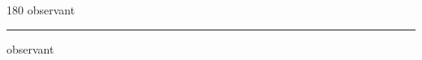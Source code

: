 
\begin{frame}
\begin{center}
\begin{turn}{180}
{\fontsize{2.5cm}{1em}\selectfont observant}
\end{turn}
\vspace{1em}\par  
\hrule
\vspace{1em}\par  
{\fontsize{2.5cm}{1em}\selectfont observant}
\end{center}
\end{frame}
